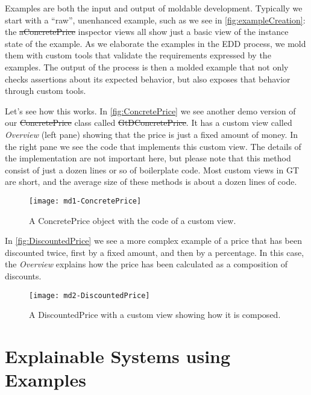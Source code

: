 \documentclass[sigplan,anonymous,review,10pt]{acmart}
\begin{document}
Examples are both the input and output of moldable development.
Typically we start with a ``raw'', unenhanced example, such as we see in \autoref{fig:exampleCreation}: the \st{aConcretePrice} inspector views all show just a basic view of the instance state of the example.
As we elaborate the examples in the EDD process, we mold them with custom tools that validate the requirements expressed by the examples.
The output of the process is then a molded example that not only checks assertions about its expected behavior, but also exposes that behavior through custom tools.

Let's see how this works.
In \autoref{fig:ConcretePrice} we see another demo version of our \st{ConcretePrice} class called \st{GtDConcretePrice}.
It has a custom view called \emph{Overview} (left pane) showing that the price is just a fixed amount of money.
In the right pane we see the code that implements this custom view.
The details of the implementation are not important here, but please note that this method consist of just a dozen lines or so of boilerplate code.
Most custom views in GT are short, and the average size of these methods is about a dozen lines of code.

\begin{figure}[h]
  \texttt{[image: md1-ConcretePrice]}
  \caption{A ConcretePrice object with the code of a custom view.}
  \label{fig:ConcretePrice}
\end{figure}

In \autoref{fig:DiscountedPrice} we see a more complex example of a price that has been discounted twice, first by a fixed amount, and then by a percentage.
In this case, the \emph{Overview} explains how the price has been calculated as a composition of discounts.

\begin{figure}[h]
  \texttt{[image: md2-DiscountedPrice]}
  \caption{A DiscountedPrice with a custom view showing how it is composed.}
  \label{fig:DiscountedPrice}
\end{figure}

\section{Explainable Systems using Examples}\label{sec:explainable}

\end{document}
